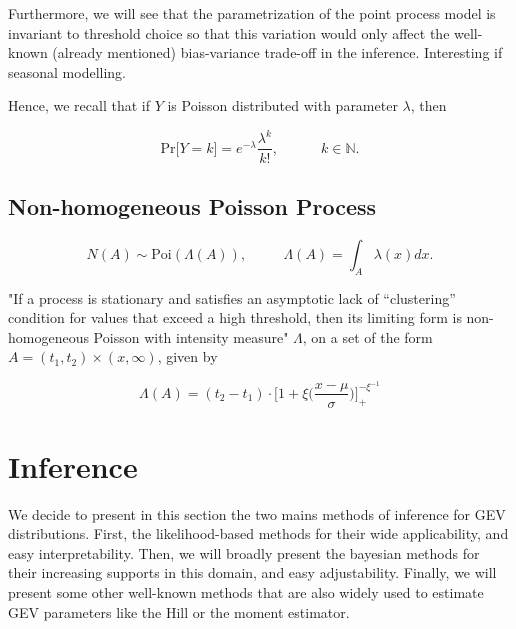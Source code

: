 \documentclass[11pt,a4paper,openany ]{book}
\begin{document}
Furthermore, we will see that the parametrization of the point process model is invariant to threshold choice %
so that this variation would only affect the well-known (already mentioned) bias-variance trade-off in the inference. Interesting if seasonal modelling.




Hence, we recall that if $Y$ is Poisson distributed with parameter $\lambda$, then 

\begin{equation}\label{poissdist}
\text{Pr}\big[Y=k\big]= e^{-\lambda}\frac{\lambda^k}{k!}, \qquad\quad k\in\mathbb{N.}
\end{equation}


\subsection{Non-homogeneous Poisson Process} 

\begin{equation}
N(A)\sim \text{Poi}(\Lambda(A)), \ \ \ \ \ \ \ \,\ \ \ \ \Lambda (A) = \int_A \lambda (x)dx.
\end{equation}


 "If a process is stationary and satisfies an asymptotic
lack of “clustering” condition for values that exceed a high threshold, then its limiting form is
non-homogeneous Poisson with intensity measure" $\Lambda$, on a set of the form $A = (t_1,t_2)\times (x,\infty)$, given by 

\begin{equation}
\Lambda(A) = (t_2-t_1)\cdot\bigg[1+\xi\bigg(\frac{x-\mu}{\sigma}\bigg)\bigg]^{-\xi^{-1}}_+
\end{equation}





\section{Inference}\label{sec::gevinfernce} 


\iffalse
We decide to present in this section the two mains methods of inference for GEV distributions. First, the likelihood-based methods for their wide applicability, and easy interpretability. Then, we will broadly present the bayesian methods for their increasing supports in this domain, and easy adjustability. Finally, we will present some other well-known methods that are also widely used to estimate GEV parameters like the Hill or the moment estimator.
\end{document}
